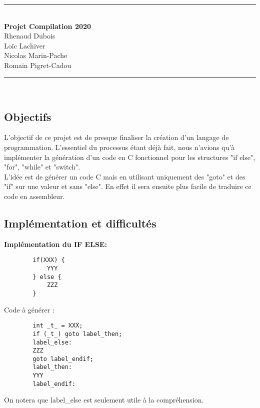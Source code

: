 \documentclass[12pt, a4paper]{article}
\begin{document}


\begin{center}
    \rule{\linewidth}{0.5mm} \\
    \Large\textbf{Projet Compilation 2020\\}
    Rhenaud Dubois\\
    Loïc Lachiver\\
    Nicolas Marin-Pache\\
    Romain Pigret-Cadou
    
    \rule{\linewidth}{0.5mm} \\
\end{center}



\subsection*{Objectifs}
L'objectif de ce projet est de presque finaliser la création d'un langage de programmation. L'essentiel du processus étant déjà fait, nous n'avions qu'à implémenter la génération d'un code en C fonctionnel pour les structures "if else", "for", "while" et "switch".
\\
L'idée est de générer un code C mais en utilisant uniquement des "goto" et des "if" sur une valeur et sans "else". En effet il sera ensuite plus facile de traduire ce code en assembleur.


\subsection*{Implémentation et difficultés}
\textbf{Implémentation du IF ELSE:}

\begin{codequote}
    \begin{verbatim}
        if(XXX) {
            YYY
        } else {
            ZZZ
        }
    \end{verbatim}
\end{codequote}
Code à générer :
\begin{codequote}
    \begin{verbatim}
        int _t_ = XXX;
        if (_t_) goto label_then;
        label_else:
        ZZZ
        goto label_endif;
        label_then:
        YYY
        label_endif:
    \end{verbatim}
\end{codequote}
On notera que label\_else est seulement utile à la compréhension.\\
\end{document}
